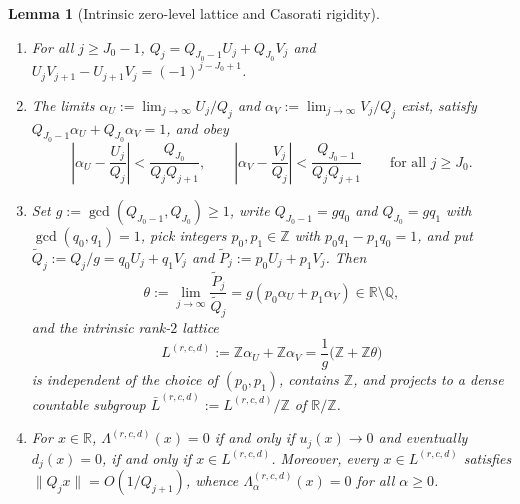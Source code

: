 \documentclass[11pt]{article}
\newtheorem{lemma}[theorem]{Lemma}
\theoremstyle{definition}
\theoremstyle{remark}
\newcommand{\R}{\mathbb{R}}
\newcommand{\Z}{\mathbb{Z}}
\newcommand{\Q}{\mathbb{Q}}
\newcommand{\Lam}{\Lambda}
\begin{document}
\begin{lemma}[Intrinsic zero-level lattice and Casorati rigidity]\label{lem:poly-lattice}
\begin{enumerate}[label=(\roman*),leftmargin=2em]
\item For all $j\ge J_0-1$, $Q_j=Q_{J_0-1}U_j+Q_{J_0}V_j$ and
$U_jV_{j+1}-U_{j+1}V_j=(-1)^{j-J_0+1}$.
\item The limits $\alpha_U:=\lim_{j\to\infty}U_j/Q_j$ and
$\alpha_V:=\lim_{j\to\infty}V_j/Q_j$ exist, satisfy
$Q_{J_0-1}\alpha_U+Q_{J_0}\alpha_V=1$, and obey
\[
\left|\alpha_U-\frac{U_j}{Q_j}\right|<\frac{Q_{J_0}}{Q_jQ_{j+1}},\qquad
\left|\alpha_V-\frac{V_j}{Q_j}\right|<\frac{Q_{J_0-1}}{Q_jQ_{j+1}}
\qquad\text{for all }j\ge J_0.
\]
\item Set $g:=\gcd(Q_{J_0-1},Q_{J_0})\ge1$, write $Q_{J_0-1}=gq_0$ and
$Q_{J_0}=gq_1$ with $\gcd(q_0,q_1)=1$, pick integers $p_0,p_1\in\Z$ with
$p_0q_1-p_1q_0=1$, and put $\tilde Q_j:=Q_j/g=q_0U_j+q_1V_j$ and
$\tilde P_j:=p_0U_j+p_1V_j$. Then
\[
\theta:=\lim_{j\to\infty}\frac{\tilde P_j}{\tilde Q_j}=g(p_0\alpha_U+p_1\alpha_V)\in\R\setminus\Q,
\]
and the intrinsic rank-$2$ lattice
\[
L^{(r,c,d)}:=\Z\alpha_U+\Z\alpha_V=\frac{1}{g}\bigl(\Z+\Z\theta\bigr)
\]
is independent of the choice of $(p_0,p_1)$, contains $\Z$, and projects to a
dense countable subgroup $\bar L^{(r,c,d)}:=L^{(r,c,d)}/\Z$ of $\R/\Z$.
\item For $x\in\R$, $\Lam^{(r,c,d)}(x)=0$ if and only if $u_j(x)\to0$ and
eventually $d_j(x)=0$, if and only if $x\in L^{(r,c,d)}$. Moreover, every
$x\in L^{(r,c,d)}$ satisfies $\|Q_jx\|=O(1/Q_{j+1})$, whence
$\Lam_\alpha^{(r,c,d)}(x)=0$ for all $\alpha\ge0$.
\end{enumerate}
\end{lemma}
\end{document}
